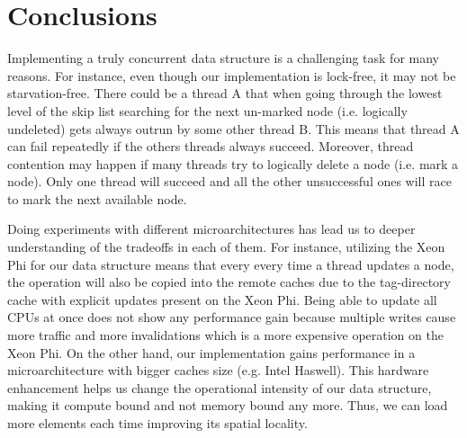 \section{Conclusions}
\label{sec:con}

Implementing a truly concurrent data structure is a challenging task for many reasons. For instance, even though our implementation is lock-free, it may not be starvation-free. There could be a thread A that when going through the lowest level of the skip list searching for the next un-marked node (i.e. logically undeleted) gets always outrun by some other thread B. This means that thread A can fail repeatedly if the others threads always succeed. Moreover, thread contention may happen if many threads try to logically delete a node (i.e. mark a node). Only one thread will succeed and all the other unsuccessful ones will race to mark 
the next available node. 

Doing experiments with different microarchitectures has lead us to deeper understanding of the tradeoffs in each of them. For instance, utilizing the Xeon Phi for our data structure means that every every time a thread updates a node, the operation will also be copied into the remote caches due to the tag-directory cache with explicit updates present on the Xeon Phi. Being able to update all CPUs at once does not show any performance gain because multiple writes cause more traffic and more invalidations which is a more expensive operation on the Xeon Phi. On the other hand, our implementation gains performance in a microarchitecture with bigger caches size (e.g. Intel Haswell). This hardware enhancement helps us change the operational intensity of our data structure, making it compute bound and not memory bound any more. Thus, we can load more elements each time improving its spatial locality.